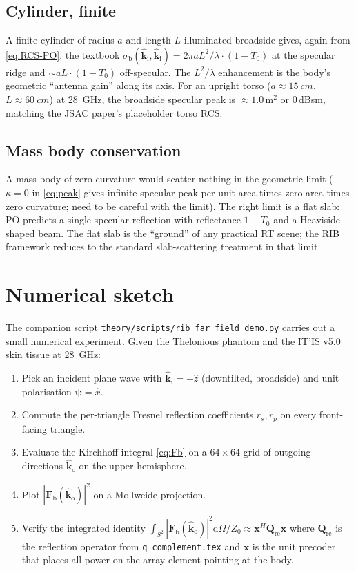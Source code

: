 \documentclass[11pt,a4paper]{article}
\theoremstyle{definition}
\newcommand{\diff}{\mathrm{d}}
\newcommand{\Qref}{\mathbf{Q}_{\mathrm{re}}}
\newcommand{\kin}{\hat{\bm{k}}_{\mathrm{i}}}
\newcommand{\kout}{\hat{\bm{k}}_{\mathrm{o}}}
\newcommand{\Frib}{\mathbf{F}_{\mathrm{b}}}
\newcommand{\sigb}{\sigma_{\mathrm{b}}}
\begin{document}
\subsection{Cylinder, finite}

A finite cylinder of radius $a$ and length $L$ illuminated broadside
gives, again from \cref{eq:RCS-PO}, the textbook
$\sigb(\kin,\kin)=2\pi a L^2/\lambda\cdot(1-T_0)$ at the
specular ridge and $\sim a L\cdot(1-T_0)$ off-specular.  The
$L^2/\lambda$ enhancement is the body's geometric ``antenna gain''
along its axis.  For an upright torso ($a\approx\SI{15}{cm}$,
$L\approx\SI{60}{cm}$) at \SI{28}{GHz}, the broadside specular peak
is $\approx 1.0\,\mathrm{m^2}$ or $0\,$dBsm, matching the JSAC
paper's placeholder torso RCS.

\subsection{Mass body conservation}

A mass body of zero curvature would scatter nothing in the geometric
limit ($\kappa=0$ in \cref{eq:peak} gives infinite specular peak per
unit area times zero area times zero curvature; need to be careful
with the limit).  The right limit is a flat slab: PO predicts a single
specular reflection with reflectance $1-T_0$ and a Heaviside-shaped
beam.  The flat slab is the ``ground'' of any practical RT scene; the
RIB framework reduces to the standard slab-scattering treatment in
that limit.

\section{Numerical sketch}\label{sec:numerical}

The companion script
\texttt{theory/scripts/rib\_far\_field\_demo.py} carries out a small
numerical experiment.  Given the Thelonious phantom and the IT'IS
v5.0 skin tissue at \SI{28}{GHz}:

\begin{enumerate}[leftmargin=1.6em,itemsep=3pt]
\item Pick an incident plane wave with $\kin=-\hat z$
(downtilted, broadside) and unit polarisation
$\bm\psi=\hat x$.
\item Compute the per-triangle Fresnel reflection coefficients
$r_s,r_p$ on every front-facing triangle.
\item Evaluate the Kirchhoff integral \cref{eq:Fb} on a $64\times 64$
grid of outgoing directions $\kout$ on the upper hemisphere.
\item Plot $|\Frib(\kout)|^2$ on a Mollweide projection.
\item Verify the integrated identity
$\int_{S^2}|\Frib(\kout)|^2\diff\Omega/Z_0 \approx
\mathbf{x}^H\Qref\mathbf{x}$
where $\Qref$ is the reflection operator from
\texttt{q\_complement.tex} and $\mathbf{x}$ is the unit precoder
that places all power on the array element pointing at the body.
\end{enumerate}
\end{document}
